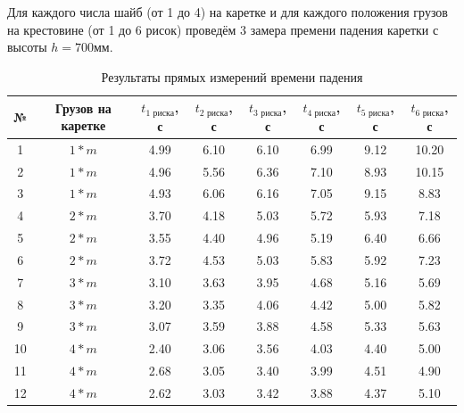 \documentclass[12pt, a4paper]{article}
\begin{document}
Для каждого числа шайб (от 1 до 4) на каретке и для каждого положения грузов на крестовине (от 1 до 6 рисок) проведём 3 замера премени падения каретки с высоты $h=700$мм.

\begin{table}[h!]
\begin{center}
\begin{tabular}{|c|c|c|c|c|c|c|c|}
\hline
№ & Грузов на каретке & $t_{\text{1 риска}}$, с & $t_{\text{2 риска}}$, с & $t_{\text{3 риска}}$, с & $t_{\text{4 риска}}$, с & $t_{\text{5 риска}}$, с & $t_{\text{6 риска}}$, с\\
\hline
1 & $1*m $ &4.99 & 6.10 & 6.10 & 6.99 & 9.12 & 10.20\\ 
\hline 
2 & $1*m $ &4.96 & 5.56 & 6.36 & 7.10 & 8.93 & 10.15\\ 
\hline 
3 & $1*m $ &4.93 & 6.06 & 6.16 & 7.05 & 9.15 & 8.83\\ 
\hline 
4 & $2*m $ &3.70 & 4.18 & 5.03 & 5.72 & 5.93 & 7.18\\ 
\hline 
5 & $2*m $ &3.55 & 4.40 & 4.96 & 5.19 & 6.40 & 6.66\\ 
\hline 
6 & $2*m $ &3.72 & 4.53 & 5.03 & 5.83 & 5.92 & 7.23\\ 
\hline 
7 & $3*m $ &3.10 & 3.63 & 3.95 & 4.68 & 5.16 & 5.69\\ 
\hline 
8 & $3*m $ &3.20 & 3.35 & 4.06 & 4.42 & 5.00 & 5.82\\ 
\hline 
9 & $3*m $ &3.07 & 3.59 & 3.88 & 4.58 & 5.33 & 5.63\\ 
\hline 
10 & $4*m $ &2.40 & 3.06 & 3.56 & 4.03 & 4.40 & 5.00\\ 
\hline 
11 & $4*m $ &2.68 & 3.05 & 3.40 & 3.99 & 4.51 & 4.90\\ 
\hline 
12 & $4*m $ &2.62 & 3.03 & 3.42 & 3.88 & 4.37 & 5.10\\ 
\hline 
\end{tabular}
\caption{Результаты прямых измерений времени падения}
\end{center}
\label{tab:1}
\end{table}
\newpage
\end{document}
